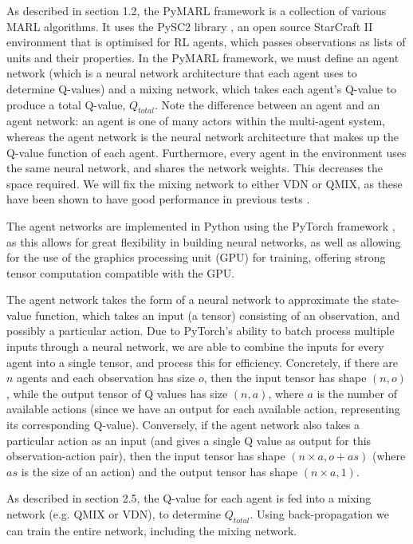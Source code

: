 As described in section 1.2, the PyMARL framework is a collection of various MARL algorithms. It uses the PySC2 library \cite{pysc2}, an open source StarCraft II environment that is optimised for RL agents, which passes observations as lists of units and their properties. In the PyMARL framework, we must define an agent network (which is a neural network architecture that each agent uses to determine Q-values) and a mixing network, which takes each agent's Q-value to produce a total Q-value, $Q_{total}$. Note the difference between an agent and an agent network: an agent is one of many actors within the multi-agent system, whereas the agent network is the neural network architecture that makes up the Q-value function of each agent. Furthermore, every agent in the environment uses the same neural network, and shares the network weights. This decreases the space required. We will fix the mixing network to either VDN or QMIX, as these have been shown to have good performance in previous tests \cite{smac}. 

The agent networks are implemented in Python using the PyTorch framework \cite{pytorch}, as this allows for great flexibility in building neural networks, as well as allowing for the use of the graphics processing unit (GPU) for training, offering strong tensor computation compatible with the GPU.

The agent network takes the form of a neural network to approximate the state-value function, which takes an input (a tensor) consisting of an observation, and possibly a particular action. Due to PyTorch's ability to batch process multiple inputs through a neural network, we are able to combine the inputs for every agent into a single tensor, and process this for efficiency. Concretely, if there are $n$ agents and each observation has size $o$, then the input tensor has shape $(n, o)$, while the output tensor of Q values has size $(n, a)$, where $a$ is the number of available actions (since we have an output for each available action, representing its corresponding Q-value). Conversely, if the agent network also takes a particular action as an input (and gives a single Q value as output for this observation-action pair), then the input tensor has shape $(n \times a, o+as)$ (where $as$ is the size of an action) and the output tensor has shape $(n \times a, 1)$.

As described in section 2.5, the Q-value for each agent is fed into a mixing network (e.g. QMIX or VDN), to determine $Q_{total}$. Using back-propagation we can train the entire network, including the mixing network.

